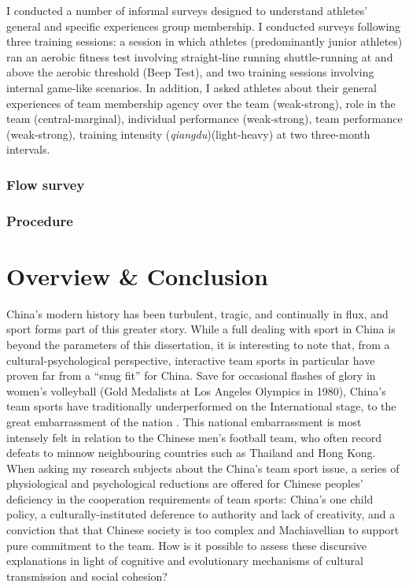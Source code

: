      I conducted a number of informal surveys designed to understand athletes' general and specific experiences group membership.  I conducted surveys following three training sessions: a session in which athletes (predominantly junior athletes) ran an aerobic fitness test involving straight-line running shuttle-running at and above the aerobic threshold (Beep Test), and two training sessions involving internal game-like scenarios.  In addition, I asked athletes about their general experiences of team membership agency over the team (weak-strong), role in the team (central-marginal), individual performance (weak-strong), team performance (weak-strong), training intensity (\textit{qiangdu})(light-heavy) at two three-month intervals.
        \subsubsection{Flow survey}
    \subsubsection{Procedure} %





  \section{Overview & Conclusion}










China's modern history has been turbulent, tragic, and continually in flux, and sport forms part of this greater story.  While a full dealing with sport in China is beyond the parameters of this dissertation, it is interesting to note that, from a cultural-psychological perspective, interactive team sports in particular have proven far from a ``snug fit'' for China.  Save for occasional flashes of glory in women's volleyball (Gold Medalists at Los Angeles Olympics in 1980), China's team sports have traditionally underperformed on the International stage, to the great embarrassment of the nation \citep{Brownell2008}.  This national embarrassment is most intensely felt in relation to the Chinese men's football team, who often record defeats to minnow neighbouring countries such as Thailand and Hong Kong. When asking my research subjects about the China's team sport issue, a series of physiological and psychological reductions are offered for Chinese peoples' deficiency in the cooperation requirements of team sports: China's one child policy, a culturally-instituted deference to authority and lack of creativity, and a conviction that that Chinese society is too complex and Machiavellian to support pure commitment to the team.  How is it possible to assess these discursive explanations in light of cognitive and evolutionary mechanisms of cultural transmission and social cohesion?

